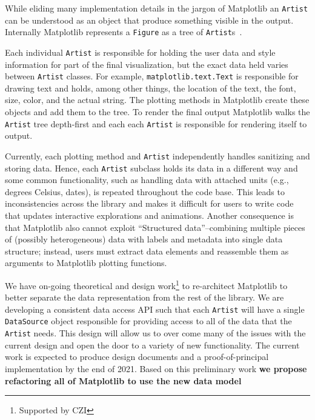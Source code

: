 \documentclass[12pt]{article}
\numberwithin{page}{section}
\begin{document}
While eliding many implementation details in the jargon of Matplotlib
an \texttt{Artist} can be understood as an object that produce
something visible in the output.  Internally Matplotlib represents a
\texttt{Figure} as a tree of \texttt{Artist}s~\cite{AOSA_mpl}.

Each individual \texttt{Artist} is responsible for holding the user
data and style information for part of the final visualization, but
the exact data held varies between \texttt{Artist} classes.  For
example, \texttt{matplotlib.text.Text} is responsible for drawing text
and holds, among other things, the location of the text, the font,
size, color, and the actual string.  The plotting methods in
Matplotlib create these objects and add them to the tree.  To render
the final output Matplotlib walks the \texttt{Artist} tree depth-first
and each each \texttt{Artist} is responsible for rendering itself to
output.

Currently, each plotting method and \texttt{Artist} independently
handles sanitizing and storing data.  Hence, each \texttt{Artist}
subclass holds its data in a different way and some common
functionality, such as handling data with attached units (e.g.,
degrees Celsius, dates), is repeated throughout the code base.  This
leads to inconsistencies across the library and makes it difficult for
users to write code that updates interactive explorations and
animations.  Another consequence is that Matplotlib also cannot
exploit ``Structured data''--combining multiple pieces of (possibly
heterogeneous) data with labels and metadata into single data
structure; instead, users must extract data elements and reassemble
them as arguments to Matplotlib plotting functions.

We have on-going theoretical and design work\footnote{Supported by
CZI} to re-architect Matplotlib to better separate the data
representation from the rest of the library.  We are developing a
consistent data access API such that each \texttt{Artist} will have a
single \texttt{DataSource} object responsible for providing access to
all of the data that the \texttt{Artist} needs.  This design will
allow us to over come many of the issues with the current design and
open the door to a variety of new functionality.  The current work is
expected to produce design documents and a proof-of-principal
implementation by the end of 2021.  Based on this preliminary work
\textbf{we propose refactoring all of Matplotlib to use the new data
  model}
\end{document}
